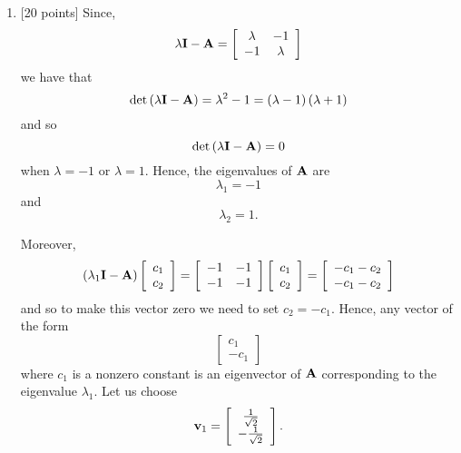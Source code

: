 \begin{solution}
\begin{enumerate}
\item {[20 points]} Since,
\[
\lambda{\bf I}-{\bf A}=\left[\begin{array}{cc}\lambda & -1\\-1 & \lambda\end{array}\right]
\]
we have that
\[
\det\left(\lambda{\bf I}-{\bf A}\right)=\lambda^2-1=\left(\lambda-1\right)\left(\lambda+1\right)
\]
and so
\[
\det\left(\lambda{\bf I}-{\bf A}\right)=0
\]
when $\lambda=-1$ or $\lambda=1$. Hence, the eigenvalues of ${\bf A}$ are
\[
\lambda_1=-1
\]
and
\[
\lambda_2=1.
\]

Moreover,
\[
\left(\lambda_1{\bf I}-{\bf A}\right)\left[\begin{array}{c}c_1 \\ c_2\end{array}\right]=\left[\begin{array}{cc}-1 & -1\\-1 & -1\end{array}\right]\left[\begin{array}{c}c_1 \\ c_2\end{array}\right]=\left[\begin{array}{c}-c_1-c_2 \\ -c_1-c_2\end{array}\right]
\]
and so to make this vector zero we need to set $c_2=-c_1$. Hence, any vector of the form
\[
\left[\begin{array}{c}c_1 \\ -c_1\end{array}\right]
\]
where $c_1$ is a nonzero constant is an eigenvector of ${\bf A}$ corresponding to the eigenvalue $\lambda_1$. Let us choose
\[
{\bf v}_1=\left[\begin{array}{c}{1\over\sqrt{2}} \\ -{1\over\sqrt{2}}\end{array}\right].
\]


\end{enumerate}
\end{solution}
